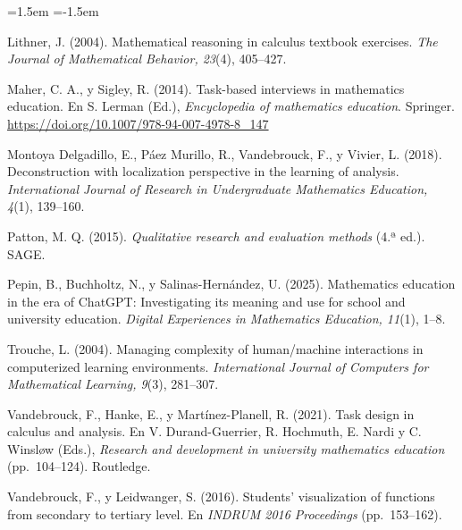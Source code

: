 \documentclass[11pt,letterpaper]{article}
\begin{document}
\begin{list}{}{\leftmargin=1.5em \itemindent=-1.5em \itemsep=3pt \parsep=0pt}
\item Lithner, J. (2004). Mathematical reasoning in calculus textbook exercises. \emph{The Journal of Mathematical Behavior, 23}(4), 405--427.
\item Maher, C. A., y Sigley, R. (2014). Task-based interviews in mathematics education. En S. Lerman (Ed.), \emph{Encyclopedia of mathematics education}. Springer. \url{https://doi.org/10.1007/978-94-007-4978-8_147}
\item Montoya Delgadillo, E., Páez Murillo, R., Vandebrouck, F., y Vivier, L. (2018). Deconstruction with localization perspective in the learning of analysis. \emph{International Journal of Research in Undergraduate Mathematics Education, 4}(1), 139--160.
\item Patton, M. Q. (2015). \emph{Qualitative research and evaluation methods} (4.ª ed.). SAGE.
\item Pepin, B., Buchholtz, N., y Salinas-Hernández, U. (2025). Mathematics education in the era of ChatGPT: Investigating its meaning and use for school and university education. \emph{Digital Experiences in Mathematics Education, 11}(1), 1--8.
\item Trouche, L. (2004). Managing complexity of human/machine interactions in computerized learning environments. \emph{International Journal of Computers for Mathematical Learning, 9}(3), 281--307.
\item Vandebrouck, F., Hanke, E., y Martínez-Planell, R. (2021). Task design in calculus and analysis. En V. Durand-Guerrier, R. Hochmuth, E. Nardi y C. Winsløw (Eds.), \emph{Research and development in university mathematics education} (pp.~104--124). Routledge.
\item Vandebrouck, F., y Leidwanger, S. (2016). Students' visualization of functions from secondary to tertiary level. En \emph{INDRUM 2016 Proceedings} (pp.~153--162).
\end{list}
\end{document}
